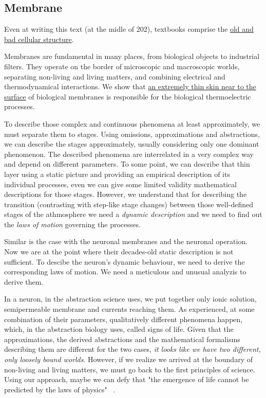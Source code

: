 \subsection{Membrane\label{sec:Physiology-Membrane}}

Even at writing this text (at the midle  of 202), textbooks comprise the
\href{https://bio.libretexts.org/@api/deki/files/78169/figure-35-01-02.png?revision=1}{old and bad cellular structure}.


Membranes are fundamental in many places, from biological objects
to industrial filters. They operate on the border of microscopic and
macroscopic worlds, separating non-living and living matters, and
combining electrical and thermodynamical interactions. We show that
\hyperlink{DynamicLayer}{an extremely thin skin near to the surface} of biological membranes
is responsible for the biological thermoelectric processes. 


To describe those complex and continuous phenomena at least approximately,
we must separate them to stages. Using omissions, approximations and
abstractions, we can describe the stages approximately, usually considering
only one dominant phenomenon. The described phenomena are interrelated
in a very complex way and depend on different parameters. To some
point, we can describe that thin layer using a static picture and
providing an empirical description of its individual processes, even
we can give some limited validity mathematical descriptions for those
stages. However, we understand that for describing the transition
(contrasting with step-like stage changes) between those well-defined
stages of the athmosphere we need a \emph{dynamic description} and
we need to find out the \emph{laws of motion} governing the processes.

Similar is the case with the neuronal membranes and the neuronal operation.
Now we are at the point where their decades-old static description
is not sufficient. To descibe the neuron's dynamic behaviour, we need
to derive the corresponding laws of motion. We need a meticulous and
unusual analyzis to derive them. 

In a neuron, in the abstraction science uses, we put together only
ionic solution, semipermeable membrane and currents reaching them.
As experienced, at some combination of their parameters, qualitatively
different phenomena happen, which, in the abstraction biology uses,
called signs of life. Given that the approximations, the derived abstractions
and the mathematical formalisms describing them are different for
the two cases, \emph{it looks like we have two different, only loosely
bound worlds}. However, if we realize we arrived at the boundary of
non-living and living matters, we must go back to the first principles
of science. Using our approach, maybe we can defy that "the
emergence of life cannot be predicted by the laws of physics" ~\cite{ConservationOfInformation:2021}.


